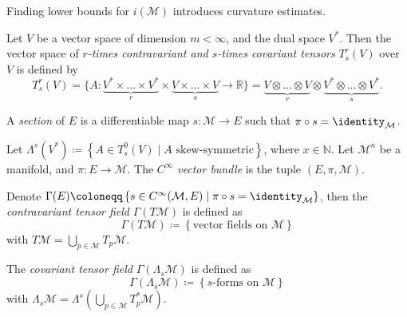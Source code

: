 \begin{note}
	Finding lower bounds for \(i(\mathcal{M})\) introduces curvature estimates.
\end{note}

\begin{definition}[Tensor]\label{def:tensor}
	Let \(V\) be a vector space of dimension \(m < \infty \), and the dual space \(V^{\ast}\). Then the vector space of \emph{\(r\)-times contravariant and \(s\)-times covariant tensors} \(T_s^r(V) \) over \(V\) is defined by
	\[
		T_s^r(V) = \{ A\colon \underbrace{V^{\ast} \times \ldots \times V^{\ast} }_{r} \times \underbrace{V\times \ldots \times V}_{s} \to \mathbb{R} \}
		= \underbrace{V \otimes \ldots \otimes V}_{r} \otimes \underbrace{V^{\ast} \otimes \ldots \otimes V^{\ast} }_{s}.
	\]
\end{definition}

\begin{definition}[Section]\label{def:section}
	A \emph{section} of \(E\) is a differentiable map \(s\colon \mathcal{M} \to E\) such that \(\pi \circ s =\identity_{\mathcal{M} } \).
\end{definition}

\begin{definition}
	Let \(\Lambda ^s(V^{\ast} ) \coloneqq \left\{ A\in T_s^0(V) \mid A \text{ skew-symmetric} \right\} \), where \(x\in \mathbb{N} \). Let \(\mathcal{M} ^n \) be a manifold, and \(\pi \colon E \to \mathcal{M} \). The \(C^{\infty} \) \emph{vector bundle} is the tuple \((E, \pi , \mathcal{M} )\).
\end{definition}

\begin{definition}\label{def:contravariant-tensor-field}
	Denote \(\Gamma (E) \coloneqq \left\{ s\in C^{\infty} (\mathcal{M} , E) \mid \pi \circ s = \identity_{\mathcal{M} } \right\}\), then the \emph{contravariant tensor field} \(\Gamma (T\mathcal{M} )\) is defined as
	\[
		\Gamma (T \mathcal{M} ) \coloneqq \left\{ \text{vector fields on } \mathcal{M} \right\}
	\]
	with \(T\mathcal{M} = \bigcup_{p\in \mathcal{M} } T_p \mathcal{M}\).
\end{definition}

\begin{definition}\label{def:covariant-tensor-field}
	The \emph{covariant tensor field} \(\Gamma (\Lambda _s \mathcal{M} )\) is defined as
	\[
		\Gamma (\Lambda _s \mathcal{M} ) \coloneqq \left\{ \text{\(s\)-forms on } \mathcal{M} \right\}
	\]
	with \(\Lambda _s \mathcal{M} = \Lambda ^s\left( \bigcup_{p\in \mathcal{M} } T^{\ast} _p \mathcal{M}  \right) \).
\end{definition}

